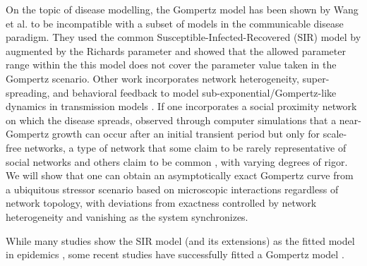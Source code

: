\documentclass{article}
\begin{document}
On the topic of disease modelling, the Gompertz model has been shown by Wang et al. \cite{wang2012richards} to be incompatible with a subset of models in the communicable disease paradigm. They used the common Susceptible-Infected-Recovered (SIR) model by \citet{kermack1927contribution} augmented by the Richards parameter \cite{richards1959flexible} and showed that the allowed parameter range within the this model does not cover the parameter value taken in the Gompertz scenario. Other work incorporates network heterogeneity, super-spreading, and behavioral feedback to model sub-exponential/Gompertz-like dynamics in transmission models \cite{vardavas2021modeling,osi2024parameter,lloyd2005superspreading}. If one incorporates a social proximity network on which the disease spreads, \citet{zonta2022virus} observed through computer simulations that a near-Gompertz growth can occur after an initial transient period but only for scale-free networks, a type of network that some claim to be rarely representative of social networks \cite{clauset2009power,broido2019scale,holme2019rare} and others claim to be common \citep{herrmann2020covid}, with varying degrees of rigor. We will show that one can obtain an asymptotically exact Gompertz curve from a ubiquitous stressor scenario based on microscopic interactions regardless of network topology, with deviations from exactness controlled by network heterogeneity and vanishing as the system synchronizes.

While many studies show the SIR model (and its extensions) as the fitted model in epidemics \cite{carletti2020covid,cooper2020sir,postnikov2020estimation,munoz2021sir,cooper2022dynamical,saikia2021covid}, some recent studies have successfully fitted a Gompertz model \cite{Ohnishi2020,Rypdal2020,Catala2020,rodrigues2020monte,Levitt2020}. 
\end{document}
